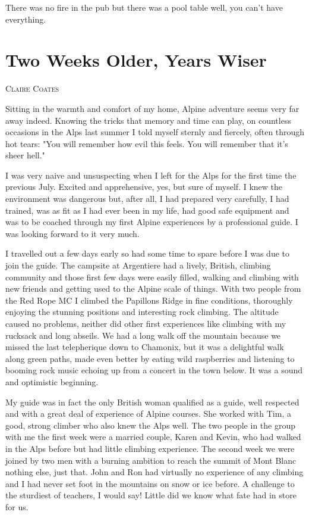 \documentclass[a5paper,openany,font 10pt]{scrbook}
\makeatletter
\newcommand{\chapterauthor}[1]{%
{\parindent0pt\vspace*{-5pt}%
\linespread{1.1}\large\scshape#1%
\par\nobreak\vspace*{35pt}}
\@afterheading%
}
\makeatother
\begin{document}
There was no fire in the pub but there was a pool table
well, you can't have everything.

\chapter{Two Weeks Older, Years Wiser}
\label{sec:org282fe4a}
\chapterauthor{Claire Coates}

Sitting in the warmth and comfort of my home, Alpine
adventure seems very far away indeed. Knowing the tricks that
memory and time can play, on countless occasions in the Alps last
summer I told myself sternly and fiercely, often through hot
tears:
	"You will remember how evil this feels. You will remember
that it's sheer hell."

I was very naive and unsuspecting when I left for the Alps
for the first time the previous July. Excited and apprehensive,
yes, but sure of myself. I knew the environment was dangerous
but, after all, I had prepared very carefully, I had trained, was
as fit as I had ever been in my life, had good safe equipment and
was to be coached through my first Alpine experiences by a
professional guide. I was looking forward to it very much.

I travelled out a few days early so had some time to spare
before I was due to join the guide. The campsite at Argentiere
had a lively, British, climbing community and those first few
days were easily filled, walking and climbing with new friends
and getting used to the Alpine scale of things. With two people
from the Red Rope MC I climbed the  Papillons Ridge  in fine
conditions, thoroughly enjoying the stunning positions and
interesting rock climbing. The altitude caused no problems,
neither did other first experiences like climbing with my
rucksack and long abseils. We had a long walk off the mountain
because we missed the last telepherique down to Chamonix, but it
was a delightful walk along green paths, made even better by
eating wild raspberries and listening to booming rock music
echoing up from a concert in the town below. It was a sound and
optimistic beginning.

My guide was in fact the only British woman qualified as a
guide, well respected and with a great deal of experience of
Alpine courses. She worked with Tim, a good, strong climber who
also knew the Alps well. The two people in the group with me the
first week were a married couple, Karen and Kevin, who had walked
in the Alps before but had little climbing experience. The second
week we were joined by two men with a burning ambition to reach
the summit of Mont Blanc  nothing else, just that. John and Ron
had virtually no experience of any climbing and I had never set
foot in the mountains on snow or ice before. A challenge to the
sturdiest of teachers, I would say! Little did we know what fate
had in store for us.
\end{document}
